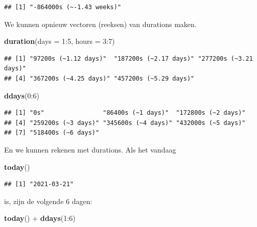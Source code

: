 \documentclass[]{tufte-book}
\newenvironment{Shaded}{}{}
\newcommand{\DataTypeTok}[1]{\textcolor[rgb]{0.56,0.13,0.00}{#1}}
\newcommand{\DecValTok}[1]{\textcolor[rgb]{0.25,0.63,0.44}{#1}}
\newcommand{\KeywordTok}[1]{\textcolor[rgb]{0.00,0.44,0.13}{\textbf{#1}}}
\newcommand{\NormalTok}[1]{#1}
\newcommand{\OperatorTok}[1]{\textcolor[rgb]{0.40,0.40,0.40}{#1}}
\newcommand{\StringTok}[1]{\textcolor[rgb]{0.25,0.44,0.63}{#1}}
\begin{document}
\begin{verbatim}
## [1] "-864000s (~-1.43 weeks)"
\end{verbatim}

We kunnen opnieuw vectoren (reeksen) van durations maken.

\begin{Shaded}
\begin{Highlighting}[]
\KeywordTok{duration}\NormalTok{(}\DataTypeTok{days =} \DecValTok{1}\OperatorTok{:}\DecValTok{5}\NormalTok{, }\DataTypeTok{hours =} \DecValTok{3}\OperatorTok{:}\DecValTok{7}\NormalTok{)}
\end{Highlighting}
\end{Shaded}

\begin{verbatim}
## [1] "97200s (~1.12 days)"  "187200s (~2.17 days)" "277200s (~3.21 days)"
## [4] "367200s (~4.25 days)" "457200s (~5.29 days)"
\end{verbatim}

\begin{Shaded}
\begin{Highlighting}[]
\KeywordTok{ddays}\NormalTok{(}\DecValTok{0}\OperatorTok{:}\DecValTok{6}\NormalTok{)}
\end{Highlighting}
\end{Shaded}

\begin{verbatim}
## [1] "0s"                "86400s (~1 days)"  "172800s (~2 days)"
## [4] "259200s (~3 days)" "345600s (~4 days)" "432000s (~5 days)"
## [7] "518400s (~6 days)"
\end{verbatim}

En we kunnen rekenen met durations. Als het vandaag

\begin{Shaded}
\begin{Highlighting}[]
\KeywordTok{today}\NormalTok{()}
\end{Highlighting}
\end{Shaded}

\begin{verbatim}
## [1] "2021-03-21"
\end{verbatim}

is, zijn de volgende 6 dagen:

\begin{Shaded}
\begin{Highlighting}[]
\KeywordTok{today}\NormalTok{() }\OperatorTok{+}\StringTok{ }\KeywordTok{ddays}\NormalTok{(}\DecValTok{1}\OperatorTok{:}\DecValTok{6}\NormalTok{)}
\end{Highlighting}
\end{Shaded}
\end{document}
